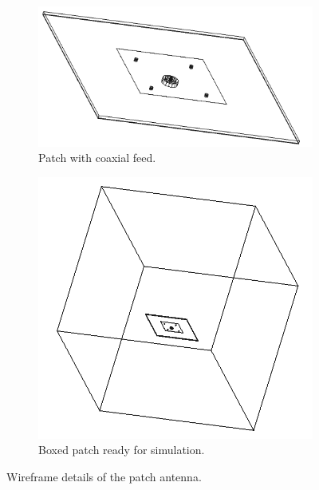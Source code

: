 \documentclass[titlepage]{article}
\renewcommand\_{\textunderscore\linebreak[1]}
\begin{document}
\begin{figure}[H]
  \centering
  \begin{subfigure}[t]{0.48\textwidth}
     \includegraphics[width=1\linewidth]{../regression/OpenParEM3D/antenna/patch_study/screenshots/patch_with_feed}
     \caption{Patch with coaxial feed.}
  \end{subfigure}
  \begin{subfigure}[t]{0.48\textwidth}
     \includegraphics[width=1\linewidth]{../regression/OpenParEM3D/antenna/patch_study/screenshots/patch_boxed}
     \caption{Boxed patch ready for simulation.}
  \end{subfigure}
  \caption{Wireframe details of the patch antenna.}
  \label{fig:patch_detail}
\end{figure}
\end{document}
